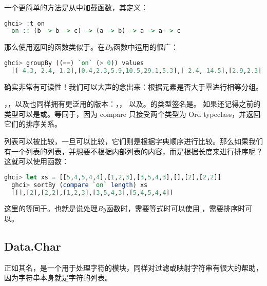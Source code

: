 \documentclass[./main.tex]{subfiles}
\begin{document}
一个更简单的方法是从中加载函数，其定义：

\begin{lstlisting}[language=Haskell]
  ghci> :t on
  on :: (b -> b -> c) -> (a -> b) -> a -> a -> c
\end{lstlisting}

那么使用返回的函数类似于。在\textit{By}函数中运用的很广：

\begin{lstlisting}[language=Haskell]
  ghci> groupBy ((==) `on` (> 0)) values
  [[-4.3,-2.4,-1.2],[0.4,2.3,5.9,10.5,29.1,5.3],[-2.4,-14.5],[2.9,2.3]]
\end{lstlisting}

确实非常有可读性！我们可以大声的念出来：根据元素是否大于零进行相等分组。

，，以及也同样拥有更泛用的版本：，，
以及。的类型签名是。
如果还记得之前的类型可以是或。等同于，因为
compare 只接受两个类型为 Ord typeclass，并返回它们的排序关系。

列表可以被比较，一旦可以比较，它们则是根据字典顺序进行比较。那么如果我们有一个列表的列表，并想要不根据内部列表的内容，而是根据长度来进行排序呢？
这就可以使用函数：

\begin{lstlisting}[language=Haskell]
  ghci> let xs = [[5,4,5,4,4],[1,2,3],[3,5,4,3],[],[2],[2,2]]
  ghci> sortBy (compare `on` length) xs
  [[],[2],[2,2],[1,2,3],[3,5,4,3],[5,4,5,4,4]]
\end{lstlisting}

这里的等同于。也就是说处理\textit{By}函数时，需要等式时可以使用
，需要排序时可以。

\subsection*{Data.Char}

正如其名，是一个用于处理字符的模块，同样对过滤或映射字符串有很大的帮助，因为字符串本身就是字符的列表。
\end{document}
